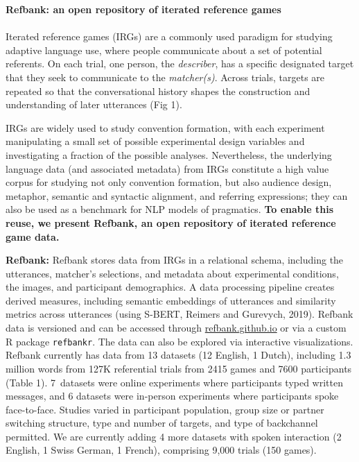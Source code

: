 \documentclass[11pt,a4paper]{article}
\renewcommand{\title}[1]{\textbf{#1}\\}
\newcommand{\authors}[1]{\iftoggle{anonymous}{\phantom{#1}}{#1}\\}
\begin{document}
\noindent\title{Refbank: an open repository of iterated reference games}
\authors{Veronica Boyce\textsuperscript{1,2},
	 Alvin W. M. Tan\textsuperscript{1}, 
	 Jess Mankewitz\textsuperscript{1,3},
	  Fiona Feng\textsuperscript{4}, 
	  Benji Fernandez\textsuperscript{1},
	   Ryder Fried\textsuperscript{1}, 
	    Ben Prystawski\textsuperscript{1}, 
	    Michael C. Frank\textsuperscript{1}, Robert D. Hawkins\textsuperscript{1} \\ \textsuperscript{1} Stanford, \textsuperscript{2} MIT, \textsuperscript{3} UW Madison, \textsuperscript{4} Queen's University} %

\vspace{-8pt}
Iterated reference games (IRGs) are a commonly used paradigm for studying adaptive language use, where people communicate about a set of potential referents. On each trial, one person, the \textit{describer}, has a specific designated target that they seek to communicate to the \textit{matcher(s)}. Across trials, targets are repeated so that the conversational history shapes the construction and understanding of later utterances (Fig 1). 

IRGs are widely used to study convention formation, with each experiment manipulating a small set of possible experimental design variables %
and investigating a fraction of the possible analyses. Nevertheless, the underlying language data (and associated metadata) from IRGs constitute a high value corpus for studying not only convention formation, but also audience design, metaphor, semantic and syntactic alignment, and referring expressions; they can also be used as a benchmark for NLP models of pragmatics. \textbf{To enable this reuse, we present Refbank, an open repository of iterated reference game data.}

\smallskip
 \textbf{Refbank:}  Refbank stores data from IRGs in a relational schema, including the utterances, matcher's selections, and metadata about experimental conditions, the images, and participant demographics. A data processing pipeline creates derived measures, including semantic embeddings of utterances and similarity metrics across utterances (using S-BERT, Reimers and Gurevych, 2019).
 Refbank data is versioned and can be accessed through \url{refbank.github.io} or via a custom R package \texttt{refbankr}. The data can also be explored via interactive visualizations. 
Refbank currently has data from 13 datasets (12 English, 1 Dutch), including 1.3 million words from 127K referential trials from 2415 games and 7600 participants (Table 1). 7~datasets were online experiments where participants typed written messages, and 6 datasets were in-person experiments where participants spoke face-to-face. Studies varied in participant population, group size or partner switching structure, type and number of targets, and type of backchannel permitted. We are currently adding 4 more datasets with spoken interaction (2 English, 1 Swiss German, 1 French), comprising 9,000 trials (150 games).
\end{document}

